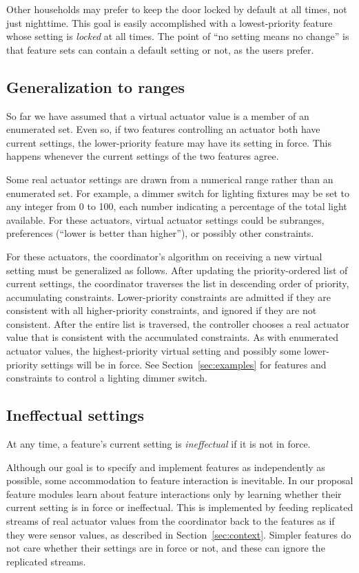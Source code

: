 \documentclass[conference]{IEEEtran}
\begin{document}
Other households may prefer to keep the door locked by default at all
times, not just nighttime.
This goal is easily accomplished with a lowest-priority feature whose
setting is {\it locked} at all times.
The point of ``no setting means no change'' is that feature sets
can contain a default setting or not, as the users prefer.

\subsection{Generalization to ranges}
\label{sec:ranges}

So far we have assumed that a virtual actuator value is a
member of an enumerated set.
Even so, if two features controlling an actuator both have current
settings, the lower-priority feature may have its setting in force.
This happens whenever the current settings of the two features agree.

Some real actuator settings are
drawn from a numerical range rather than an enumerated set.
For example, a dimmer switch for lighting
fixtures may be set to any integer from 0 to 100,
each number indicating a percentage of the total light available.
For these actuators, virtual actuator settings could be subranges,
preferences (``lower is better than higher''), or possibly other
constraints.

For these actuators, the coordinator's algorithm on receiving a new
virtual setting must be generalized as follows.
After updating the priority-ordered list of current settings,
the coordinator traverses the list in descending order of priority,
accumulating constraints.
Lower-priority constraints are admitted if they are consistent with all
higher-priority constraints, and ignored if they are not consistent.
After the entire list is traversed, the controller chooses a real
actuator value that is consistent with the accumulated constraints.
As with enumerated actuator values, the highest-priority virtual setting
and possibly some lower-priority settings will be in force.
See Section~\ref{sec:examples} for features and constraints to
control a lighting dimmer switch.

\subsection{Ineffectual settings}
\label{sec:failure}

At any time, a feature's current setting is {\it ineffectual} if it is
not in force.

Although our goal is to specify and implement features as independently
as possible,
some accommodation to feature interaction is inevitable.
In our proposal feature modules learn about feature interactions
only by learning whether their
current setting is in force or ineffectual.
This is implemented by feeding replicated streams of
real actuator values from the
coordinator back to the features as if they were sensor values, as
described in Section~\ref{sec:context}.
Simpler features do not care whether their settings are in force or
not, and these can ignore the replicated streams.
\end{document}

